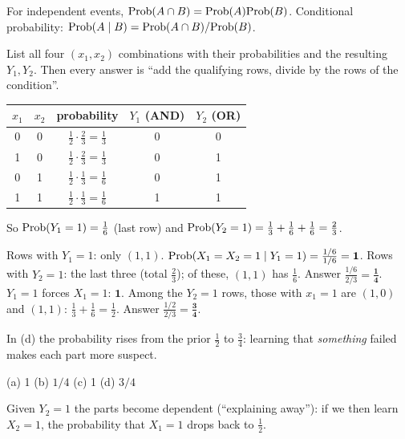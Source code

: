 \documentclass[11pt]{article}
\begin{document}
\begin{recall}
For independent events, $\mathrm{Prob}(A\cap B)=\mathrm{Prob}(A)\mathrm{Prob}(B)$. Conditional probability: $\mathrm{Prob}(A\mid B)=\mathrm{Prob}(A\cap B)/\mathrm{Prob}(B)$.
\end{recall}

\begin{keyidea}
List all four $(x_1,x_2)$ combinations with their probabilities and the resulting $Y_1,Y_2$. Then every answer is ``add the qualifying rows, divide by the rows of the condition''.
\end{keyidea}

\solution
{}
\begin{center}
\begin{tabular}{cc|c|cc}\toprule
$x_1$ & $x_2$ & probability & $Y_1$ (AND) & $Y_2$ (OR)\\\midrule
0&0&$\frac12\cdot\frac23=\frac13$&0&0\\
1&0&$\frac12\cdot\frac23=\frac13$&0&1\\
0&1&$\frac12\cdot\frac13=\frac16$&0&1\\
1&1&$\frac12\cdot\frac13=\frac16$&1&1\\\bottomrule
\end{tabular}
\end{center}
So $\mathrm{Prob}(Y_1=1)=\frac16$ (last row) and $\mathrm{Prob}(Y_2=1)=\frac13+\frac16+\frac16=\frac23$.

 Rows with $Y_1=1$: only $(1,1)$. $\mathrm{Prob}(X_1=X_2=1\mid Y_1=1)=\frac{1/6}{1/6}=\mathbf1$.
 Rows with $Y_2=1$: the last three (total $\frac23$); of these, $(1,1)$ has $\frac16$. Answer $\frac{1/6}{2/3}=\mathbf{\frac14}$.
 $Y_1=1$ forces $X_1=1$: $\mathbf1$.
 Among the $Y_2=1$ rows, those with $x_1=1$ are $(1,0)$ and $(1,1)$: $\frac13+\frac16=\frac12$. Answer $\frac{1/2}{2/3}=\mathbf{\frac34}$.

\begin{sanity}
In (d) the probability rises from the prior $\frac12$ to $\frac34$: learning that \emph{something} failed makes each part more suspect. \checkmark
\end{sanity}

\begin{answer}
(a) 1 \qquad (b) $1/4$ \qquad (c) 1 \qquad (d) $3/4$
\end{answer}

\begin{takeaway}
Given $Y_2=1$ the parts become dependent (``explaining away''): if we then learn $X_2=1$, the probability that $X_1=1$ drops back to $\frac12$.
\end{takeaway}
\end{document}
